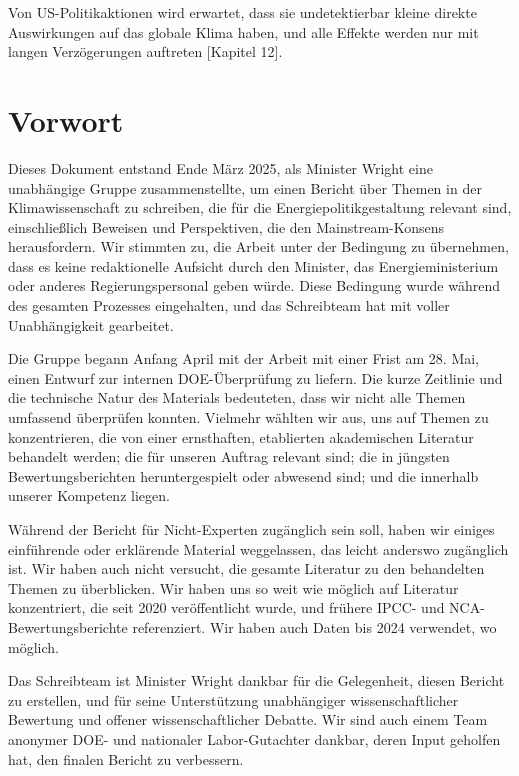 \documentclass[12pt,paper=a4,DIV=12,parskip=never,chapterprefix=false,headings=standardclasses]{scrreprt}
\begin{document}
Von US-Politikaktionen wird erwartet, dass sie undetektierbar kleine direkte Auswirkungen auf das globale Klima haben, und alle Effekte werden nur mit langen Verzögerungen auftreten [Kapitel 12].

\cleardoublepage
\chapter*{Vorwort}
Dieses Dokument entstand Ende März 2025, als Minister Wright eine unabhängige Gruppe zusammenstellte, um einen Bericht über Themen in der Klimawissenschaft zu schreiben, die für die Energiepolitikgestaltung relevant sind, einschließlich Beweisen und Perspektiven, die den Mainstream-Konsens herausfordern. Wir stimmten zu, die Arbeit unter der Bedingung zu übernehmen, dass es keine redaktionelle Aufsicht durch den Minister, das Energieministerium oder anderes Regierungspersonal geben würde. Diese Bedingung wurde während des gesamten Prozesses eingehalten, und das Schreibteam hat mit voller Unabhängigkeit gearbeitet.

Die Gruppe begann Anfang April mit der Arbeit mit einer Frist am 28. Mai, einen Entwurf zur internen DOE-Überprüfung zu liefern. Die kurze Zeitlinie und die technische Natur des Materials bedeuteten, dass wir nicht alle Themen umfassend überprüfen konnten. Vielmehr wählten wir aus, uns auf Themen zu konzentrieren, die von einer ernsthaften, etablierten akademischen Literatur behandelt werden; die für unseren Auftrag relevant sind; die in jüngsten Bewertungsberichten heruntergespielt oder abwesend sind; und die innerhalb unserer Kompetenz liegen.

Während der Bericht für Nicht-Experten zugänglich sein soll, haben wir einiges einführende oder erklärende Material weggelassen, das leicht anderswo zugänglich ist. Wir haben auch nicht versucht, die gesamte Literatur zu den behandelten Themen zu überblicken. Wir haben uns so weit wie möglich auf Literatur konzentriert, die seit 2020 veröffentlicht wurde, und frühere IPCC- und NCA-Bewertungsberichte referenziert. Wir haben auch Daten bis 2024 verwendet, wo möglich.

Das Schreibteam ist Minister Wright dankbar für die Gelegenheit, diesen Bericht zu erstellen, und für seine Unterstützung unabhängiger wissenschaftlicher Bewertung und offener wissenschaftlicher Debatte. Wir sind auch einem Team anonymer DOE- und nationaler Labor-Gutachter dankbar, deren Input geholfen hat, den finalen Bericht zu verbessern.
\vspace{2ex}
\end{document}
